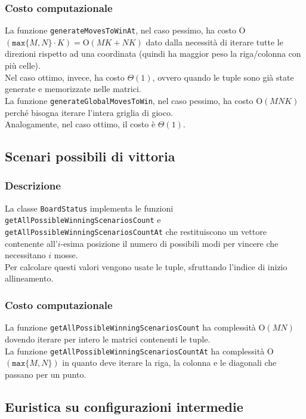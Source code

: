 \documentclass[11pt]{article}
\begin{document}
\subsubsection*{Costo computazionale}
La funzione \texttt{generateMovesToWinAt}, nel caso pessimo, ha costo O$(\texttt{max}\{M, N\} \cdot K) = \text{O}(MK+NK)$ dato dalla necessità di iterare tutte le direzioni rispetto ad una coordinata (quindi ha maggior peso la riga/colonna con più celle).\\
Nel caso ottimo, invece, ha costo $\Theta(1)$, ovvero quando le tuple sono già state generate e memorizzate nelle matrici.\\
La funzione \texttt{generateGlobalMovesToWin}, nel caso pessimo, ha costo O$(MNK)$ perché bisogna iterare l'intera griglia di gioco.\\
Analogamente, nel caso ottimo, il costo è $\Theta(1)$.

\subsection*{Scenari possibili di vittoria}
\subsubsection*{Descrizione}
La classe \texttt{BoardStatus} implementa le funzioni \texttt{getAllPossibleWinningScenariosCount} e \texttt{getAllPossibleWinningScenariosCountAt} che restituiscono un vettore contenente all'$i$-esima posizione il numero di possibili modi per vincere che necessitano $i$ mosse.\\
Per calcolare questi valori vengono usate le tuple, sfruttando l'indice di inizio allineamento.
\subsubsection*{Costo computazionale}
La funzione \texttt{getAllPossibleWinningScenariosCount} ha complessità O$(MN)$ dovendo iterare per intero le matrici contenenti le tuple.\\
La funzione \texttt{getAllPossibleWinningScenariosCountAt} ha complessità O$(\texttt{max}\{M, N\})$ in quanto deve iterare la riga, la colonna e le diagonali che passano per un punto.

\newpage

\subsection*{Euristica su configurazioni intermedie}
\end{document}
